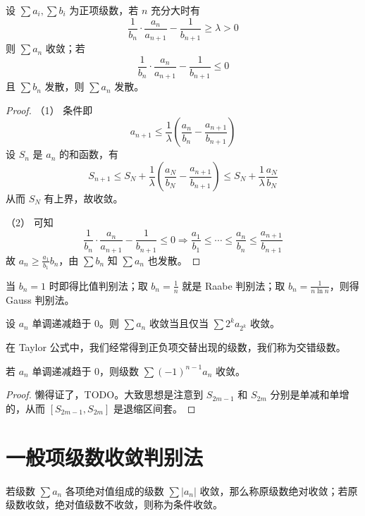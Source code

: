 \begin{theorem}[Kummer]
	设 $\sum a_i, \sum b_i$ 为正项级数，若 $n$ 充分大时有
	\[ \frac{1}{b_n} \cdot \frac{a_n}{a_{n+1}} - \frac{1}{b_{n+1}} \geqslant \lambda > 0 \]
	则 $\sum a_n$ 收敛；若
	\[ \frac{1}{b_n} \cdot \frac{a_n}{a_{n+1}} - \frac{1}{b_{n+1}} \leqslant 0 \]
	且 $\sum b_n$ 发散，则 $\sum a_n$ 发散。
\end{theorem}

\begin{proof}
	（1） 条件即
	\[ a_{n+1} \leqslant \frac{1}{\lambda} \left( \frac{a_n}{b_n} - \frac{a_{n+1}}{b_{n+1}} \right) \]
	设 $S_n$ 是 $a_n$ 的和函数，有
	\[ S_{n+1} \leqslant S_N +\frac{1}{\lambda} \left( \frac{a_N}{b_N} - \frac{a_{n+1}}{b_{n+1}} \right) \leqslant S_N + \frac{1}{\lambda} \frac{a_N}{b_N} \]
	从而 $S_N$ 有上界，故收敛。

	（2） 可知
	\[ \frac{1}{b_n} \cdot \frac{a_n}{a_{n+1}} - \frac{1}{b_{n+1}} \leqslant 0 \Longrightarrow \frac{a_1}{b_1} \leqslant \cdots \leqslant \frac{a_n}{b_n} \leqslant \frac{a_{n+1}}{b_{n+1}} \]
	故 $a_n \geqslant \frac{a_1}{b_1} b_n$，由 $\sum b_n$ 知 $\sum a_n$ 也发散。
\end{proof}

当 $b_n = 1$ 时即得比值判别法；取 $b_n = \frac{1}{n}$ 就是 Raabe 判别法；取 $b_n = \frac{1}{n \ln n}$，则得 Gauss 判别法。

\begin{theorem}
	设 $a_n$ 单调递减趋于 $0$。则 $\sum a_n$ 收敛当且仅当 $\sum 2^k a_{2^k}$ 收敛。
\end{theorem}

在 Taylor 公式中，我们经常得到正负项交替出现的级数，我们称为交错级数。

\begin{theorem}
	若 $a_n$ 单调递减趋于 $0$，则级数 $\sum (-1)^{n-1} a_n$ 收敛。
\end{theorem}

\begin{proof}
	懒得证了，TODO。大致思想是注意到 $S_{2m-1}$ 和 $S_{2m}$ 分别是单减和单增的，从而 $[S_{2m-1}, S_{2m}]$ 是退缩区间套。
\end{proof}

\section{一般项级数收敛判别法}

若级数 $\sum a_n$ 各项绝对值组成的级数 $\sum |a_n|$ 收敛，那么称原级数绝对收敛；若原级数收敛，绝对值级数不收敛，则称为条件收敛。

